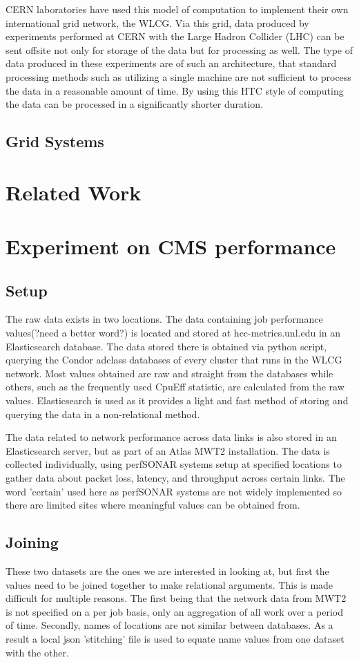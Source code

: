 \documentclass[]{scrartcl}
\begin{document}
CERN laboratories have used this model of computation to implement their own international grid network, the WLCG. Via this grid, data produced by experiments performed at CERN with the Large Hadron Collider (LHC) can be sent offsite not only for storage of the data but for processing as well. The type of data produced in these experiments are of such an architecture, that standard processing methods such as utilizing a single machine are not sufficient to process the data in a reasonable amount of time. By using this HTC style of computing the data can be processed in a significantly shorter duration.
\subsection{Grid Systems}

\section{Related Work}

\section{Experiment on CMS performance}
\subsection{Setup}
The raw data exists in two locations. The data containing job performance values(?need a better word?) is located and stored at hcc-metrics.unl.edu in an Elasticsearch database. The data stored there is obtained via python script, querying the Condor adclass databases of every cluster that runs in the WLCG network. Most values obtained are raw and straight from the databases while others, such as the frequently used CpuEff statistic, are calculated from the raw values. Elasticsearch is used as it provides a light and fast method of storing and querying the data in a non-relational method.

The data related to network performance across data links is also stored in an Elasticsearch server, but as part of an Atlas MWT2 installation. The data is collected individually, using perfSONAR systems setup at specified locations to gather data about packet loss, latency, and throughput across certain links. The word 'certain' used here as perfSONAR systems are not widely implemented so there are limited sites where meaningful values can be obtained from.
\subsection{Joining}
These two datasets are the ones we are interested in looking at, but first the values need to be joined together to make relational arguments. This is made difficult for multiple reasons. The first being that the network data from MWT2 is not specified on a per job basis, only an aggregation of all work over a period of time. Secondly, names of locations are not similar between databases. As a result a local json 'stitching' file is used to equate name values from one dataset with the other. 
\end{document}
